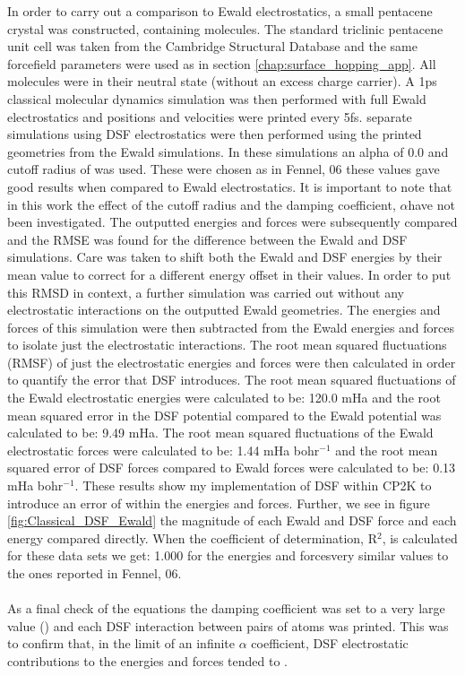 In order to carry out a comparison to Ewald electrostatics, a small pentacene crystal was constructed, containing  molecules. The standard triclinic pentacene unit cell was taken from the Cambridge Structural Database \cite{CSD} and the same forcefield parameters were used as in section \ref{chap:surface_hopping_app}. All molecules were in their neutral state (without an excess charge carrier). A 1ps classical molecular dynamics simulation was then performed with full Ewald electrostatics and positions and velocities were printed every 5fs.  separate simulations using DSF electrostatics were then performed using the printed geometries from the Ewald simulations. In these simulations an alpha of 0.0 and cutoff radius of  was used. These were chosen as in Fennel, 06 \cite{DSF} these values gave good results when compared to Ewald electrostatics. It is important to note that in this work the effect of the cutoff radius and the damping coefficient, $\alpha$\madd{, }have not been investigated. The outputted energies and forces were subsequently compared and the RMSE was found for the difference between the Ewald and DSF simulations. Care was taken to shift both the Ewald and DSF energies by their mean value to correct for a different energy offset in their values. In order to put this RMSD in context, a further simulation was carried out without any electrostatic interactions on the outputted Ewald geometries. The energies and forces of this simulation were then subtracted from the Ewald energies and forces to isolate just the electrostatic interactions. The root mean squared fluctuations (RMSF) of just the electrostatic energies and forces were then calculated in order to quantify the error that DSF introduces. The root mean squared fluctuations of the Ewald electrostatic energies were calculated to be: 120.0 mHa and the root mean squared error in the DSF potential compared to the Ewald potential was calculated to be: 9.49 mHa. The root mean squared fluctuations of the Ewald electrostatic forces were calculated to be: 1.44 mHa bohr$^{-1}$ and the root mean squared error of DSF forces compared to Ewald forces were calculated to be: 0.13 mHa bohr$^{-1}$. These results show my implementation of DSF within CP2K to introduce an error of  within the energies and forces. Further, we see in figure \ref{fig:Classical_DSF_Ewald} the magnitude of each Ewald and DSF force and each energy compared directly. When the coefficient of determination, R$^2$, is calculated for these data sets we get: 1.000 for the energies and forces\replace{ -}{, }very similar values to the ones reported in Fennel, 06.
\\\\
As a final check of the equations the damping coefficient was set to a very large value () and each DSF interaction between pairs of atoms was printed. This was to confirm that, in the limit of an infinite $\alpha$ coefficient, DSF electrostatic contributions to the energies and forces tended to . 
